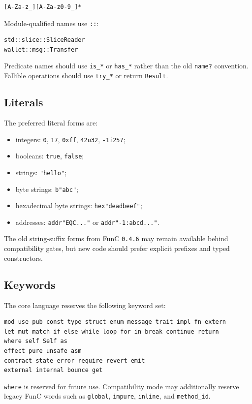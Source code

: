 \documentclass[12pt,oneside]{article}
\begin{document}
\begin{verbatim}
[A-Za-z_][A-Za-z0-9_]*
\end{verbatim}

Module-qualified names use \verb|::|:

\begin{verbatim}
std::slice::SliceReader
wallet::msg::Transfer
\end{verbatim}

Predicate names should use \verb|is_*| or \verb|has_*| rather than the old
\verb|name?| convention. Fallible operations should use \verb|try_*| or return
\verb|Result|.

\subsection{Literals}
The preferred literal forms are:

\begin{itemize}
\item integers: \verb|0|, \verb|17|, \verb|0xff|, \verb|42u32|,
\verb|-1i257|;
\item booleans: \verb|true|, \verb|false|;
\item strings: \verb|"hello"|;
\item byte strings: \verb|b"abc"|;
\item hexadecimal byte strings: \verb|hex"deadbeef"|;
\item addresses: \verb|addr"EQC..."| or \verb|addr"-1:abcd..."|.
\end{itemize}

The old string-suffix forms from FunC \verb|0.4.6| may remain available behind
compatibility gates, but new code should prefer explicit prefixes and typed
constructors.

\subsection{Keywords}
\label{sec:keywords}
The core language reserves the following keyword set:

\begin{verbatim}
mod use pub const type struct enum message trait impl fn extern
let mut match if else while loop for in break continue return
where self Self as
effect pure unsafe asm
contract state error require revert emit
external internal bounce get
\end{verbatim}

\verb|where| is reserved for future use. Compatibility mode may
additionally reserve legacy FunC words such as \verb|global|, \verb|impure|,
\verb|inline|, and \verb|method_id|.
\end{document}
